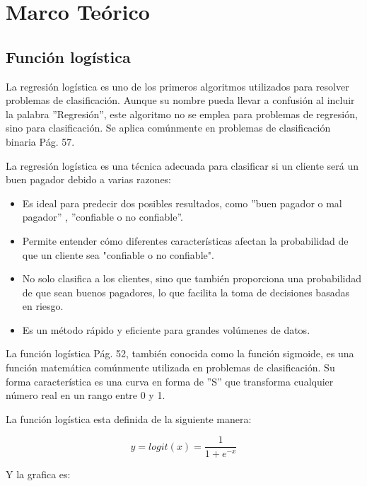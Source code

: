 \chapter{Marco Teórico}\label{cap3:Marco-Teorico}

\section{Función logística}

La regresión logística es uno de los primeros algoritmos utilizados para resolver 
problemas de clasificación. Aunque su nombre pueda llevar a confusión al incluir la 
palabra ''Regresión'', este algoritmo no se emplea para problemas de regresión, sino 
para clasificación. Se aplica comúnmente en problemas de clasificación binaria 
\cite{Brownlee} Pág. 57. \medskip

La regresión logística es una técnica adecuada para clasificar si un cliente 
será un buen pagador debido a varias razones:

\begin{itemize}
    \item Es ideal para predecir dos posibles resultados, como ''buen pagador o mal pagador'' , ''confiable o no confiable''.
    \item Permite entender cómo diferentes características afectan la probabilidad de que un cliente sea "confiable o no confiable".
    \item No solo clasifica a los clientes, sino que también proporciona una probabilidad de que sean buenos pagadores, lo que facilita la toma de decisiones basadas en riesgo.
    \item Es un método rápido y eficiente para grandes volúmenes de datos.
\end{itemize}



La función logística \cite{Brownlee} Pág. 52, también conocida como la 
función sigmoide, es una función matemática comúnmente utilizada en
problemas de clasificación. Su forma característica es una curva en forma 
de ''S'' que transforma cualquier número real en un rango entre 0 y 1. \medskip


La función logística esta definida de la siguiente manera:

$$ \displaystyle y=logit(x)= \frac{1}{1+e^{-x}} $$


Y la grafica es: 

